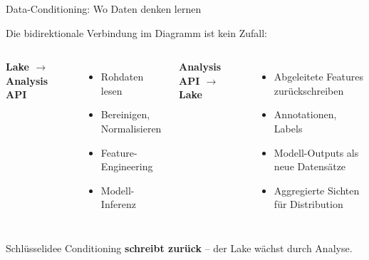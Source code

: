 \documentclass[aspectratio=169]{beamer}
\begin{document}
\begin{frame}{Data-Conditioning: Wo Daten denken lernen}
  \begin{center}
    Die bidirektionale Verbindung im Diagramm ist kein Zufall:
  \end{center}
  \vspace{0.5em}
  \begin{columns}
      \textbf{Lake $\rightarrow$ Analysis API}
      \begin{itemize}
        \item Rohdaten lesen
        \item Bereinigen, Normalisieren
        \item Feature-Engineering
        \item Modell-Inferenz
      \end{itemize}
      \textbf{Analysis API $\rightarrow$ Lake}
      \begin{itemize}
        \item Abgeleitete Features zurückschreiben
        \item Annotationen, Labels
        \item Modell-Outputs als neue Datensätze
        \item Aggregierte Sichten für Distribution
      \end{itemize}
  \end{columns}
  \vspace{0.5em}
  \begin{exampleblock}{Schlüsselidee}
    Conditioning \textbf{schreibt zurück} – der Lake wächst durch Analyse.
  \end{exampleblock}
\end{frame}
\end{document}
